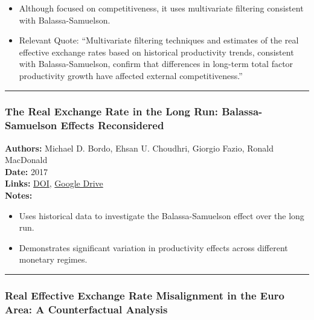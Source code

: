 \documentclass[
  11pt,
]{article}
\providecommand{\tightlist}{%
  \setlength{\itemsep}{0pt}\setlength{\parskip}{0pt}}
\begin{document}
\begin{itemize}
\tightlist
\item
  Although focused on competitiveness, it uses multivariate filtering
  consistent with Balassa-Samuelson.
\item
  Relevant Quote: ``Multivariate filtering techniques and estimates of
  the real effective exchange rates based on historical productivity
  trends, consistent with Balassa-Samuelson, confirm that differences in
  long-term total factor productivity growth have affected external
  competitiveness.''
\end{itemize}

\begin{center}\rule{0.5\linewidth}{0.5pt}\end{center}

\subsubsection{The Real Exchange Rate in the Long Run: Balassa-Samuelson
Effects
Reconsidered}\label{the-real-exchange-rate-in-the-long-run-balassa-samuelson-effects-reconsidered}

\textbf{Authors:} Michael D. Bordo, Ehsan U. Choudhri, Giorgio Fazio,
Ronald MacDonald\\
\textbf{Date:} 2017\\
\textbf{Links:}
\href{https://doi.org/10.1016/j.jimonfin.2017.03.011}{DOI},
\href{https://drive.google.com/file/d/1wpLTPo2OgVXe54w8JiDwyBwYTGqkBz4I/view?usp=sharing}{Google
Drive}\\
\textbf{Notes:}

\begin{itemize}
\tightlist
\item
  Uses historical data to investigate the Balassa-Samuelson effect over
  the long run.\\
\item
  Demonstrates significant variation in productivity effects across
  different monetary regimes.
\end{itemize}

\begin{center}\rule{0.5\linewidth}{0.5pt}\end{center}

\subsubsection{Real Effective Exchange Rate Misalignment in the Euro
Area: A Counterfactual
Analysis}\label{real-effective-exchange-rate-misalignment-in-the-euro-area-a-counterfactual-analysis}
\end{document}
